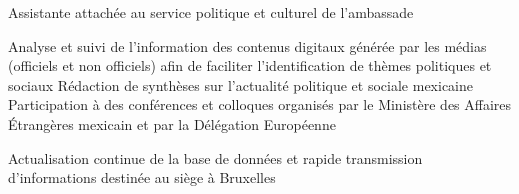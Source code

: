 \documentclass[30pt]{tccv}
\begin{document}
\begin{upshape}
\begin{experience}
 Assistante attachée au service politique et culturel de l’ambassade \\
    \setlength{\parskip}{-10pt}
    \begin{itemize}
      \cvitem[\checkmark] Analyse et suivi de l’information des contenus digitaux générée par les médias (officiels et non officiels) afin de faciliter l’identification de thèmes politiques et sociaux 
      \cvitem[\checkmark] Rédaction de synthèses sur l’actualité politique et sociale mexicaine
      \cvitem[\checkmark] Participation à des conférences et colloques organisés par le Ministère des Affaires Étrangères mexicain et par la Délégation Européenne
    \end{itemize}     
 Actualisation continue de la base de données et rapide transmission d’informations destinée au siège à Bruxelles 





\end{experience}





\end{upshape}
\end{document}
